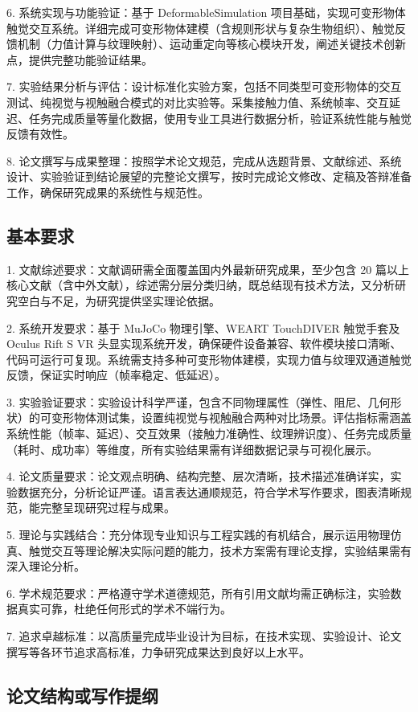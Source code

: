 6. 系统实现与功能验证：基于 DeformableSimulation 项目基础，实现可变形物体触觉交互系统。详细完成可变形物体建模（含规则形状与复杂生物组织）、触觉反馈机制（力值计算与纹理映射）、运动重定向等核心模块开发，阐述关键技术创新点，提供完整功能验证结果。

7. 实验结果分析与评估：设计标准化实验方案，包括不同类型可变形物体的交互测试、纯视觉与视触融合模式的对比实验等。采集接触力值、系统帧率、交互延迟、任务完成质量等量化数据，使用专业工具进行数据分析，验证系统性能与触觉反馈有效性。

8. 论文撰写与成果整理：按照学术论文规范，完成从选题背景、文献综述、系统设计、实验验证到结论展望的完整论文撰写，按时完成论文修改、定稿及答辩准备工作，确保研究成果的系统性与规范性。

\subsection{基本要求}

1. 文献综述要求：文献调研需全面覆盖国内外最新研究成果，至少包含 20 篇以上核心文献（含中外文献），综述需分层分类归纳，既总结现有技术方法，又分析研究空白与不足，为研究提供坚实理论依据。

2. 系统开发要求：基于 MuJoCo 物理引擎、WEART TouchDIVER 触觉手套及 Oculus Rift S VR 头显实现系统开发，确保硬件设备兼容、软件模块接口清晰、代码可运行可复现。系统需支持多种可变形物体建模，实现力值与纹理双通道触觉反馈，保证实时响应（帧率稳定、低延迟）。

3. 实验验证要求：实验设计科学严谨，包含不同物理属性（弹性、阻尼、几何形状）的可变形物体测试集，设置纯视觉与视触融合两种对比场景。评估指标需涵盖系统性能（帧率、延迟）、交互效果（接触力准确性、纹理辨识度）、任务完成质量（耗时、成功率）等维度，所有实验结果需有详细数据记录与可视化展示。

4. 论文质量要求：论文观点明确、结构完整、层次清晰，技术描述准确详实，实验数据充分，分析论证严谨。语言表达通顺规范，符合学术写作要求，图表清晰规范，能完整呈现研究过程与成果。

5. 理论与实践结合：充分体现专业知识与工程实践的有机结合，展示运用物理仿真、触觉交互等理论解决实际问题的能力，技术方案需有理论支撑，实验结果需有深入理论分析。

6. 学术规范要求：严格遵守学术道德规范，所有引用文献均需正确标注，实验数据真实可靠，杜绝任何形式的学术不端行为。

7. 追求卓越标准：以高质量完成毕业设计为目标，在技术实现、实验设计、论文撰写等各环节追求高标准，力争研究成果达到良好以上水平。

\subsection{论文结构或写作提纲}

